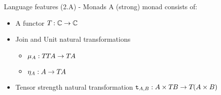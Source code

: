 \documentclass{beamer}
\newcommand\script[1]{}
\begin{document}
\begin{frame}{Language features (2.A) - Monads}
        A (strong) monad consists of:
        \begin{itemize}
            \setlength\itemsep{3em}
            \item A functor $T_{}{}: \mathbb{C}\rightarrow \mathbb{C}$
            \item Join and Unit natural transformations
            \begin{itemize}
                \item  $\mu_{A}: T_{}{T_{}{A}}\rightarrow T_{}{A}$
                \item $\eta_{A}: A\rightarrow T_{}{A}$
            \end{itemize}
            \item Tensor strength natural transformation $\texttt{t}_{A, B}: A\times T_{}{B}\rightarrow T_{}{(A\times B)}$
        \end{itemize}
        
        \script{
            - To handle effectful computations in a pure language like haskell, you need to use something called a monad.

            - This actually comes from when Moggi first discovered how to model effectful programs.
            - You need this structure of a functor from your category to itself, together with some natural transformation operations for creating and composing effectful operations.
            - If you squint a bit, they even look like the programming language monad definition.

            - An issue with haskell is that each monad only gives you one effect. If you want a program that does IO, contains state, has exceptions, and does non-determinism, you end up with a stack of monads.
            - This is still imprecise for meaningful analysis
        }


\end{frame}
\end{document}
